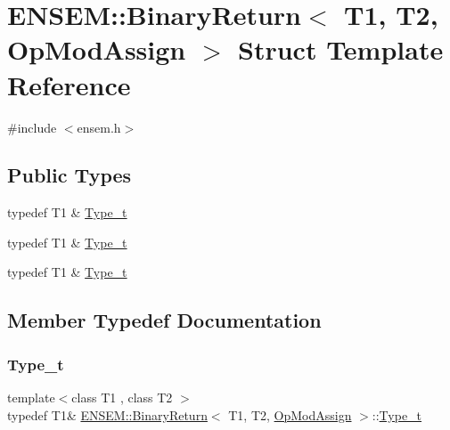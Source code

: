 \hypertarget{structENSEM_1_1BinaryReturn_3_01T1_00_01T2_00_01OpModAssign_01_4}{}\section{E\+N\+S\+EM\+:\+:Binary\+Return$<$ T1, T2, Op\+Mod\+Assign $>$ Struct Template Reference}
\label{structENSEM_1_1BinaryReturn_3_01T1_00_01T2_00_01OpModAssign_01_4}


{\ttfamily \#include $<$ensem.\+h$>$}

\subsection*{Public Types}
\begin{DoxyCompactItemize}
\item 
typedef T1 \& \mbox{\hyperlink{structENSEM_1_1BinaryReturn_3_01T1_00_01T2_00_01OpModAssign_01_4_ac06ca0711867d98edff9da57e7a2fcb3}{Type\+\_\+t}}
\item 
typedef T1 \& \mbox{\hyperlink{structENSEM_1_1BinaryReturn_3_01T1_00_01T2_00_01OpModAssign_01_4_ac06ca0711867d98edff9da57e7a2fcb3}{Type\+\_\+t}}
\item 
typedef T1 \& \mbox{\hyperlink{structENSEM_1_1BinaryReturn_3_01T1_00_01T2_00_01OpModAssign_01_4_ac06ca0711867d98edff9da57e7a2fcb3}{Type\+\_\+t}}
\end{DoxyCompactItemize}


\subsection{Member Typedef Documentation}
\mbox{\label{structENSEM_1_1BinaryReturn_3_01T1_00_01T2_00_01OpModAssign_01_4_ac06ca0711867d98edff9da57e7a2fcb3}} 
\subsubsection{\texorpdfstring{Type\_t}{Type\_t}\hspace{0.1cm}{\footnotesize\ttfamily [1/3]}}
{\footnotesize\ttfamily template$<$class T1 , class T2 $>$ \\
typedef T1\& \mbox{\hyperlink{structENSEM_1_1BinaryReturn}{E\+N\+S\+E\+M\+::\+Binary\+Return}}$<$ T1, T2, \mbox{\hyperlink{structENSEM_1_1OpModAssign}{Op\+Mod\+Assign}} $>$\+::\mbox{\hyperlink{structENSEM_1_1BinaryReturn_3_01T1_00_01T2_00_01OpModAssign_01_4_ac06ca0711867d98edff9da57e7a2fcb3}{Type\+\_\+t}}}

